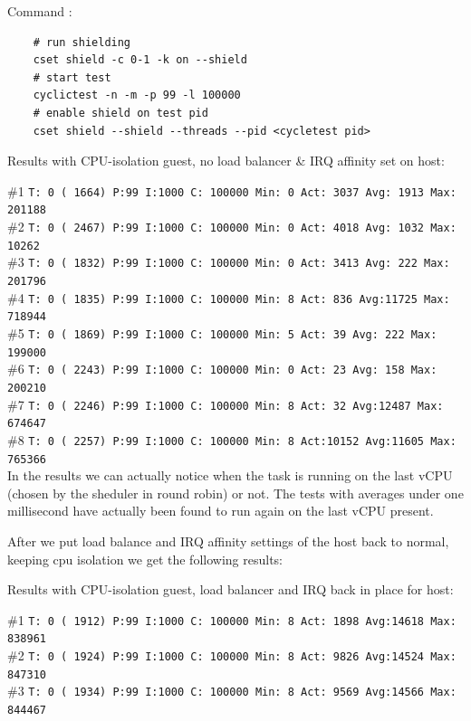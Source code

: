 \documentclass[]{scrartcl}
\begin{document}
\noindent Command : 

\begin{verbatim}
	# run shielding
	cset shield -c 0-1 -k on --shield
	# start test
	cyclictest -n -m -p 99 -l 100000
	# enable shield on test pid
	cset shield --shield --threads --pid <cycletest pid>
\end{verbatim}

\noindent Results with CPU-isolation guest, no load balancer \& IRQ affinity set on host:

\noindent \#1 \small \texttt{T: 0 ( 1664) P:99 I:1000 C: 100000 Min: 0 Act: 3037 Avg: 1913 Max:  201188}\\
\noindent \#2 \small \texttt{T: 0 ( 2467) P:99 I:1000 C: 100000 Min:      0 Act: 4018 Avg: 1032 Max:   10262}\\
\noindent \#3 \small \texttt{T: 0 ( 1832) P:99 I:1000 C: 100000 Min:      0 Act: 3413 Avg:  222 Max:  201796}\\
\noindent \#4 \small \texttt{T: 0 ( 1835) P:99 I:1000 C: 100000 Min:      8 Act:  836 Avg:11725 Max:  718944}\\
\noindent \#5 \small \texttt{T: 0 ( 1869) P:99 I:1000 C: 100000 Min:      5 Act:   39 Avg:  222 Max:  199000}\\
\noindent \#6 \small \texttt{T: 0 ( 2243) P:99 I:1000 C: 100000 Min:      0 Act:   23 Avg:  158 Max:  200210}\\
\noindent \#7 \small \texttt{T: 0 ( 2246) P:99 I:1000 C: 100000 Min:      8 Act:   32 Avg:12487 Max:  674647}\\
\noindent \#8 \small \texttt{T: 0 ( 2257) P:99 I:1000 C: 100000 Min:      8 Act:10152 Avg:11605 Max:  765366}\\

In the results we can actually notice when the task is running on the last vCPU (chosen by the sheduler in round robin) or not. The tests with averages under one millisecond have actually been found to run again on the last vCPU present. 

After we put load balance and IRQ affinity settings of the host back to normal, keeping cpu isolation we get the following results:

\bigskip

\noindent Results with CPU-isolation guest, load balancer and IRQ back in place for host:

\noindent \#1 \small \texttt{T: 0 ( 1912) P:99 I:1000 C: 100000 Min:      8 Act: 1898 Avg:14618 Max:  838961}\\
\noindent \#2 \small \texttt{T: 0 ( 1924) P:99 I:1000 C: 100000 Min:      8 Act: 9826 Avg:14524 Max:  847310}\\
\noindent \#3 \small \texttt{T: 0 ( 1934) P:99 I:1000 C: 100000 Min:      8 Act: 9569 Avg:14566 Max:  844467}
\end{document}

